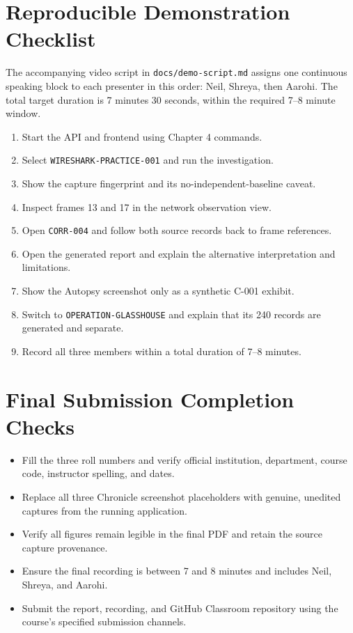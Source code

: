 \documentclass[12pt,a4paper]{report}
\newcommand{\caseid}[1]{\texttt{#1}}
\begin{document}
\appendix
\chapter{Reproducible Demonstration Checklist}
The accompanying video script in \texttt{docs/demo-script.md} assigns one continuous speaking block to each presenter in this order: Neil, Shreya, then Aarohi. The total target duration is 7 minutes 30 seconds, within the required 7--8 minute window.
\begin{enumerate}
\item Start the API and frontend using Chapter 4 commands.
\item Select \caseid{WIRESHARK-PRACTICE-001} and run the investigation.
\item Show the capture fingerprint and its no-independent-baseline caveat.
\item Inspect frames 13 and 17 in the network observation view.
\item Open \texttt{CORR-004} and follow both source records back to frame references.
\item Open the generated report and explain the alternative interpretation and limitations.
\item Show the Autopsy screenshot only as a synthetic C-001 exhibit.
\item Switch to \caseid{OPERATION-GLASSHOUSE} and explain that its 240 records are generated and separate.
\item Record all three members within a total duration of 7--8 minutes.
\end{enumerate}

\chapter{Final Submission Completion Checks}
\begin{itemize}
\item Fill the three roll numbers and verify official institution, department, course code, instructor spelling, and dates.
\item Replace all three Chronicle screenshot placeholders with genuine, unedited captures from the running application.
\item Verify all figures remain legible in the final PDF and retain the source capture provenance.
\item Ensure the final recording is between 7 and 8 minutes and includes Neil, Shreya, and Aarohi.
\item Submit the report, recording, and GitHub Classroom repository using the course's specified submission channels.
\end{itemize}
\end{document}
